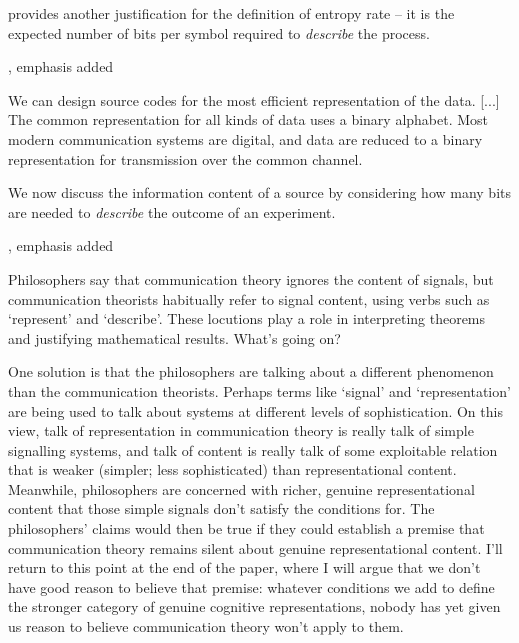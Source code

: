 \documentclass[12pt]{article}
\begin{document}
\begin{myquote}
 provides another justification for the definition of entropy rate -- it is the expected number of bits per symbol required to \textit{describe} the process.
\par\hspace*{\fill}\citet[115]{cover2006elements}, emphasis added
\end{myquote}

\begin{myquote}
We can design source codes for the most efficient representation of the data. [...] The common representation for all kinds of data uses a binary alphabet. Most modern communication systems are digital, and data are reduced to a binary representation for transmission over the common channel.
\par\hspace*{\fill}\citet[218]{cover2006elements}
\end{myquote}

\begin{myquote}
We now discuss the information content of a source by considering how many bits are needed to \textit{describe} the outcome of an experiment.
\par\hspace*{\fill}\citet[73]{mackay2003information}, emphasis added
\end{myquote}

\noindent Philosophers say that communication theory ignores the content of signals, but communication theorists habitually refer to signal content, using verbs such as `represent' and `describe'.
These locutions play a role in interpreting theorems and justifying mathematical results.
What's going on?

One solution is that the philosophers are talking about a different phenomenon than the communication theorists.
Perhaps terms like `signal' and `representation' are being used to talk about systems at different levels of sophistication.
On this view, talk of representation in communication theory is really talk of simple signalling systems, and talk of content is really talk of some exploitable relation that is weaker (simpler; less sophisticated) than representational content.
Meanwhile, philosophers are concerned with richer, genuine representational content that those simple signals don't satisfy the conditions for.
The philosophers' claims would then be true if they could establish a premise that communication theory remains silent about genuine representational content.
I'll return to this point at the end of the paper, where I will argue that we don't have good reason to believe that premise: whatever conditions we add to define the stronger category of genuine cognitive representations, nobody has yet given us reason to believe communication theory won't apply to them.
\end{document}

